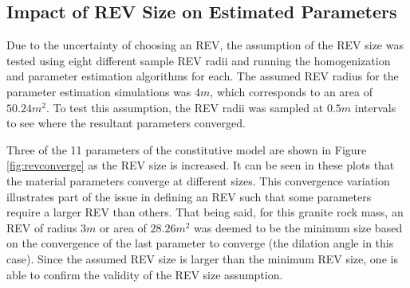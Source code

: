 \subsection{Impact of REV Size on Estimated Parameters}

Due to the uncertainty of choosing an REV, the assumption of the REV size was tested using eight different sample REV radii and running the homogenization and parameter estimation algorithms for each. The assumed REV radius for the parameter estimation simulations was $4m$, which corresponds to an area of $50.24 m^2$. To test this assumption, the REV radii was sampled at $0.5m$ intervals to see where the resultant parameters converged.

Three of the 11 parameters of the constitutive model are shown in Figure \ref{fig:revconverge} as the REV size is increased. It can be seen in these plots that the material parameters converge at different sizes. This convergence variation illustrates part of the issue in defining an REV such that some parameters require a larger REV than others. That being said, for this granite rock mass, an REV of radius $3m$ or area of $28.26 m^2$ was deemed to be the minimum size based on the convergence of the last parameter to converge (the dilation angle in this case). Since the assumed REV size is larger than the minimum REV size, one is able to confirm the validity of the REV size assumption.